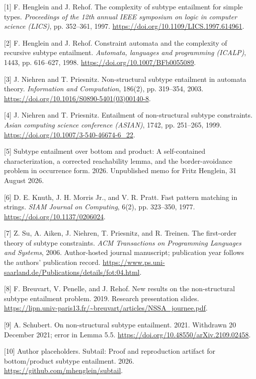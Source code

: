 \documentclass[
  11pt,
  a4paper,
]{article}
\newlength{\cslhangindent}
\newenvironment{CSLReferences}[2] %
 {\begin{list}{}{%
  \setlength{\itemindent}{0pt}
  \setlength{\leftmargin}{0pt}
  \setlength{\parsep}{0pt}
  \ifodd #1
   \setlength{\leftmargin}{\cslhangindent}
   \setlength{\itemindent}{-1\cslhangindent}
  \fi
  \setlength{\itemsep}{#2\baselineskip}}}
 {\end{list}}
\begin{document}
\protect{}\label{refs}
\begin{CSLReferences}{1}{1}
{[}1{]} F. Henglein and J. Rehof. The complexity of subtype entailment
for simple types. \emph{Proceedings of the 12th annual IEEE symposium on
logic in computer science (LICS)}, pp. 352--361, 1997.
\url{https://doi.org/10.1109/LICS.1997.614961}.

{[}2{]} F. Henglein and J. Rehof. Constraint automata and the complexity
of recursive subtype entailment. \emph{Automata, languages and
programming (ICALP)}, 1443, pp. 616--627, 1998.
\url{https://doi.org/10.1007/BFb0055089}.

{[}3{]} J. Niehren and T. Priesnitz. Non-structural subtype entailment
in automata theory. \emph{Information and Computation}, 186(2), pp.
319--354, 2003. \url{https://doi.org/10.1016/S0890-5401(03)00140-8}.

{[}4{]} J. Niehren and T. Priesnitz. Entailment of non-structural
subtype constraints. \emph{Asian computing science conference (ASIAN)},
1742, pp. 251--265, 1999.
\url{https://doi.org/10.1007/3-540-46674-6_22}.

{[}5{]} Subtype entailment over bottom and product: A self-contained
characterization, a corrected reachability lemma, and the
border-avoidance problem in occurrence form. 2026. Unpublished memo for
Fritz Henglein, 31 August 2026.

{[}6{]} D. E. Knuth, J. H. Morris Jr., and V. R. Pratt. Fast pattern
matching in strings. \emph{SIAM Journal on Computing}, 6(2), pp.
323--350, 1977. \url{https://doi.org/10.1137/0206024}.

{[}7{]} Z. Su, A. Aiken, J. Niehren, T. Priesnitz, and R. Treinen. The
first-order theory of subtype constraints. \emph{ACM Transactions on
Programming Languages and Systems}, 2006. Author-hosted journal
manuscript; publication year follows the authors' publication record.
\url{https://www.ps.uni-saarland.de/Publications/details/fot:04.html}.

{[}8{]} F. Breuvart, V. Penelle, and J. Rehof. New results on the
non-structural subtype entailment problem. 2019. Research presentation
slides.
\url{https://lipn.univ-paris13.fr/~breuvart/articles/NSSA_journee.pdf}.

{[}9{]} A. Schubert. On non-structural subtype entailment. 2021.
Withdrawn 20 December 2021; error in Lemma 5.5.
\url{https://doi.org/10.48550/arXiv.2109.02458}.

{[}10{]} Author placeholders. Subtail: Proof and reproduction artifact
for bottom/product subtype entailment. 2026.
\url{https://github.com/mhenglein/subtail}.

\end{CSLReferences}
\end{document}

